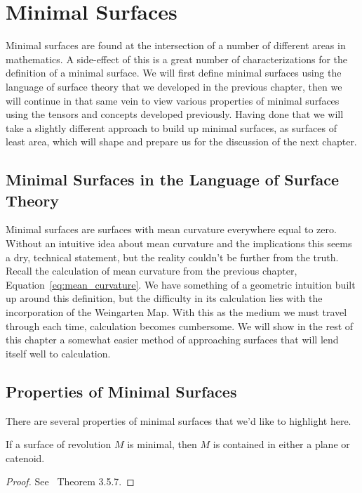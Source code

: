 \section{Minimal Surfaces}

Minimal surfaces are found at the intersection of a number of different areas in mathematics. A side-effect of this is a great number of characterizations for the definition of a minimal surface. We will first define minimal surfaces using the language of surface theory that we developed in the previous chapter, then we will continue in that same vein to view various properties of minimal surfaces using the tensors and concepts developed previously. Having done that we will take a slightly different approach to build up minimal surfaces, as surfaces of least area, which will shape and prepare us for the discussion of the next chapter.

\subsection{Minimal Surfaces in the Language of Surface Theory}

  Minimal surfaces are surfaces with mean curvature everywhere equal to zero. Without an intuitive idea about mean curvature and the implications this seems a dry, technical statement, but the reality couldn't be further from the truth. Recall the calculation of mean curvature from the previous chapter, Equation~\ref{eq:mean_curvature}. We have something of a geometric intuition built up around this definition, but the difficulty in its calculation lies with the incorporation of the Weingarten Map. With this as the medium we must travel through each time, calculation becomes cumbersome. We will show in the rest of this chapter a somewhat easier method of approaching surfaces that will lend itself well to calculation.  

\subsection{Properties of Minimal Surfaces}
  There are several properties of minimal surfaces that we'd like to highlight here.

  \begin{thm}
    If a surface of revolution $M$ is minimal, then $M$ is contained in either a plane or catenoid.
  \end{thm}
  \begin{proof}
    See~\cite{Opr07} Theorem 3.5.7.
  \end{proof}

